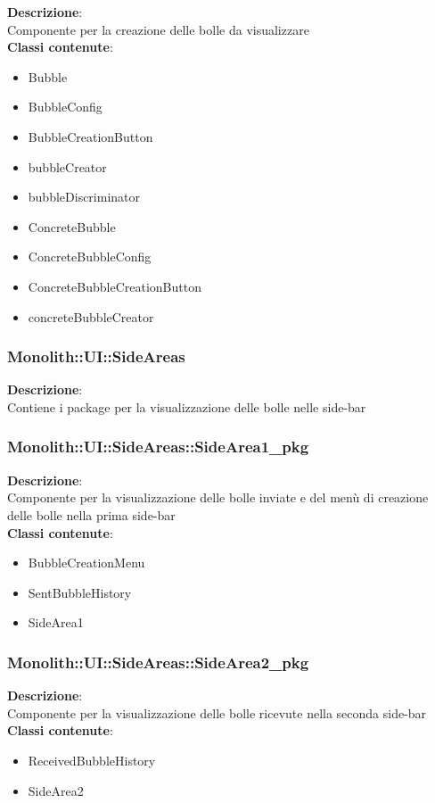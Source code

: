 \FloatBarrier
\textbf{Descrizione}:\\
 Componente per la creazione delle bolle da visualizzare 
\\ \textbf{Classi contenute}:\\
\begin{itemize}
\item Bubble
\item BubbleConfig
\item BubbleCreationButton
\item bubbleCreator
\item bubbleDiscriminator
\item ConcreteBubble
\item ConcreteBubbleConfig
\item ConcreteBubbleCreationButton
\item concreteBubbleCreator
\end{itemize}


\clearpage

\subsubsection{Monolith::UI::SideAreas}
\textbf{Descrizione}:\\
 Contiene i package per la visualizzazione delle bolle nelle side-bar 


\clearpage

\subsubsection{Monolith::UI::SideAreas::SideArea1\_pkg}
\textbf{Descrizione}:\\
 Componente per la visualizzazione delle bolle inviate e del menù di creazione delle bolle nella prima side-bar 
\\ \textbf{Classi contenute}:\\
\begin{itemize}
\item BubbleCreationMenu
\item SentBubbleHistory
\item SideArea1
\end{itemize}


\clearpage

\subsubsection{Monolith::UI::SideAreas::SideArea2\_pkg}
\textbf{Descrizione}:\\
 Componente per la visualizzazione delle bolle ricevute nella seconda side-bar 
\\ \textbf{Classi contenute}:\\
\begin{itemize}
\item ReceivedBubbleHistory
\item SideArea2
\end{itemize}


